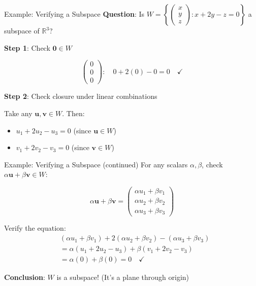 \documentclass[10pt]{beamer}
\theoremstyle{definition}
\newcommand{\x}[1]{\alert{\textbf{#1}}}
\begin{document}
\begin{frame}{Example: Verifying a Subspace}
\textbf{Question}: Is $W = \left\{ \begin{pmatrix} x \\ y \\ z \end{pmatrix} : x + 2y - z = 0 \right\}$ a subspace of $\mathbb{R}^3$?

\vfill
\textbf{Step 1}: Check $\mathbf{0} \in W$

$$\begin{pmatrix} 0 \\ 0 \\ 0 \end{pmatrix}: \quad 0 + 2(0) - 0 = 0 \quad \checkmark$$

\vfill
\textbf{Step 2}: Check closure under linear combinations

Take any $\mathbf{u}, \mathbf{v} \in W$. Then:
\begin{itemize}
\item $u_1 + 2u_2 - u_3 = 0$ (since $\mathbf{u} \in W$)
\item $v_1 + 2v_2 - v_3 = 0$ (since $\mathbf{v} \in W$)
\end{itemize}
\end{frame}

\begin{frame}{Example: Verifying a Subspace (continued)}
For any scalars $\alpha, \beta$, check $\alpha\mathbf{u} + \beta\mathbf{v} \in W$:

$$\alpha\mathbf{u} + \beta\mathbf{v} = \begin{pmatrix} \alpha u_1 + \beta v_1 \\ \alpha u_2 + \beta v_2 \\ \alpha u_3 + \beta v_3 \end{pmatrix}$$

\vfill
Verify the equation:
\begin{align*}
&(\alpha u_1 + \beta v_1) + 2(\alpha u_2 + \beta v_2) - (\alpha u_3 + \beta v_3) \\
&= \alpha(u_1 + 2u_2 - u_3) + \beta(v_1 + 2v_2 - v_3) \\
&= \alpha(0) + \beta(0) = 0 \quad \checkmark
\end{align*}

\vfill
\x{Conclusion}: $W$ is a subspace! (It's a plane through origin)
\end{frame}
\end{document}
